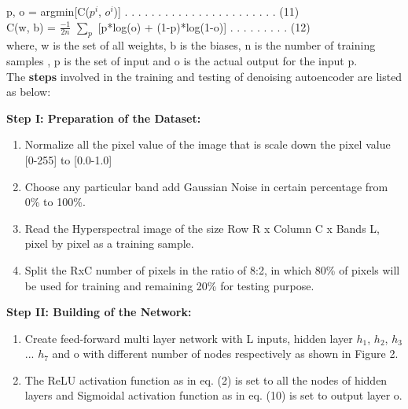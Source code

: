 \documentclass{article}
\begin{document}
p, o = argmin[C($p^i$, $o^i$)] . . . . . . . . . . . . . . . . . . . . . . . (11)\\

C(w, b) = $\frac{-1}{2n}$ $\sum_{p}$ [p*log(o) + (1-p)*log(1-o)] . . . . . . . . . (12)\\

where, w is the set of all weights, b is the biases, n is the number of training samples , p is the set of input and o is the actual output for the input p. \\


The \textbf{steps} involved in the training and testing of denoising autoencoder are listed as below:\\

\begin{flushleft}
\textbf{Step I: Preparation of the Dataset:}
\end{flushleft}

\begin{enumerate}

\item Normalize all the pixel value of the image that is scale down the pixel value [0-255] to [0.0-1.0]
\item Choose any particular band add Gaussian Noise in certain percentage from 0\% to 100\%.
\item Read the Hyperspectral image of the size Row R x Column C x Bands L, pixel by pixel as a training sample.
\item Split the RxC number of pixels in the ratio of 8:2, in which 80\% of pixels will be used for training and remaining 20\% for testing purpose.\\

\end{enumerate}

\begin{flushleft}
\textbf{Step II: Building of the Network:}
\end{flushleft}

\begin{enumerate}

\item Create feed-forward multi layer network with L inputs, hidden layer $h_{1}$, $h_{2}$, $h_{3}$ ... $h_{7}$ and o with different number of nodes respectively as shown in Figure 2.
\item The ReLU activation function as in eq. (2) is set to all the nodes of hidden layers and Sigmoidal activation function as in eq. (10) is set to output layer o. \\

\end{enumerate}
\end{document}
